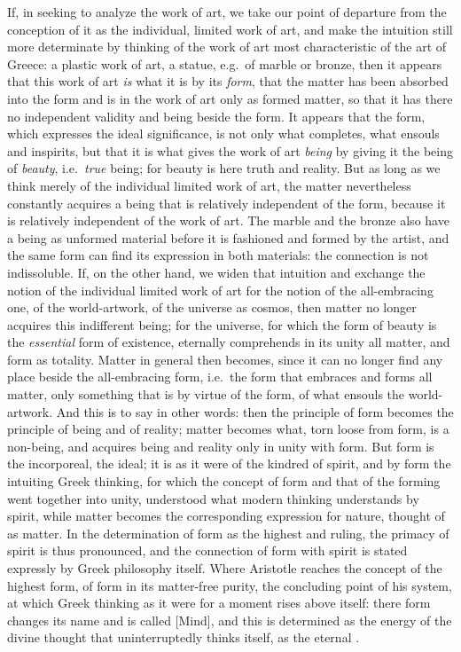 If, in seeking to analyze the work of art, we take our point of departure from
the conception of it as the individual, limited work of art, and make the
intuition still more determinate by thinking of the work of art most
characteristic of the art of Greece: a plastic work of art, a statue, e.g.\ of
marble or bronze, then it appears that this work of art \emph{is} what it is
by its \emph{form}, that the matter has been absorbed into the form and is in
the work of art only as formed matter, so that it has there no independent
validity and being beside the form. It appears that the form, which expresses
the ideal significance, is not only what completes, what ensouls and
inspirits, but that it is what gives the work of art \emph{being} by giving it
the being of \emph{beauty}, i.e.\ \emph{true} being; for beauty is here truth
and reality. But as long as we think merely of the individual limited work of
art, the matter nevertheless constantly acquires a being that is relatively
independent of the form, because it is relatively independent of the work of
art. The marble and the bronze also have a being as unformed material before
it is fashioned and formed by the artist, and the same form can find its
expression in both materials: the connection is not indissoluble. If, on the
other hand, we widen that intuition and exchange the notion of the individual
limited work of art for the notion of the all-embracing one, of the
world-artwork, of the universe as cosmos, then matter no longer acquires this
indifferent being; for the universe, for which the form of beauty is the
\emph{essential} form of existence, eternally comprehends in its unity all
matter, and form as totality. Matter in general then becomes, since it can no
longer find any place beside the all-embracing form, i.e.\ the form that
embraces and forms all matter, only something that is by virtue of the form,
of what ensouls the world-artwork. And this is to say in other words: then the
principle of form becomes the principle of being and of reality;
matter becomes what, torn loose from form, is a non-being, and acquires being
and reality only in unity with form. But form is the incorporeal, the ideal;
it is as it were of the kindred of spirit, and by form the intuiting Greek
thinking, for which the concept of form and that of the forming went together
into unity, understood what modern thinking understands by spirit, while
matter becomes the corresponding expression for nature, thought of as matter.
In the determination of form as the highest and ruling, the primacy of spirit
is thus pronounced, and the connection of form with spirit is stated expressly
by Greek philosophy itself. Where Aristotle reaches the concept of the highest
form, of form in its matter-free purity, the concluding point of his system,
at which Greek thinking as it were for a moment rises above itself: there form
changes its name and is called  [Mind], and this  is
determined as the energy of the divine thought that uninterruptedly thinks
itself, as the eternal .

